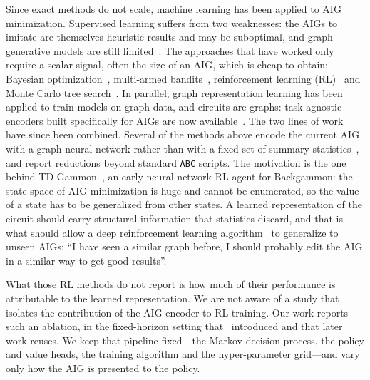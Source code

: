 \documentclass{article}
\begin{document}
Since exact methods do not scale, machine learning has been applied to AIG minimization.
Supervised learning suffers from two weaknesses: the AIGs to imitate are themselves heuristic results and may be suboptimal, and graph generative models are still limited~\cite{graphbench}.
The approaches that have worked only require a scalar signal, often the size of an AIG, which is cheap to obtain: Bayesian optimization~\cite{bayes}, multi-armed bandits~\cite{flow-bandits}, reinforcement learning (RL)~\cite{rl-logic1,rl-gnn1} and Monte Carlo tree search~\cite{gnn-mcts}.
In parallel, graph representation learning has been applied to train models on graph data, and circuits are graphs: task-agnostic encoders built specifically for AIGs are now available~\cite{deepgate,polargate,funcgnn,chipgrl}.
The two lines of work have since been combined.
Several of the methods above encode the current AIG with a graph neural network rather than with a fixed set of summary statistics~\cite{rl-gnn1,gnn-mcts,more-mcts}, and report reductions beyond standard \texttt{ABC} scripts.
The motivation is the one behind TD-Gammon~\cite{td-gammon}, an early neural network RL agent for Backgammon: the state space of AIG minimization is huge and cannot be enumerated, so the value of a state has to be generalized from other states.
A learned representation of the circuit should carry structural information that statistics discard, and that is what should allow a deep reinforcement learning algorithm~\cite{ppo} to generalize to unseen AIGs: ``I have seen a similar graph before, I should probably edit the AIG in a similar way to get good results''.

What those RL methods do not report is how much of their performance is attributable to the learned representation.
We are not aware of a study that isolates the contribution of the AIG encoder to RL training.
Our work reports such an ablation, in the fixed-horizon setting that~\citet{rl-gnn1} introduced and that later work reuses.
We keep that pipeline fixed---the Markov decision process, the policy and value heads, the training algorithm and the hyper-parameter grid---and vary only how the AIG is presented to the policy.
\end{document}
